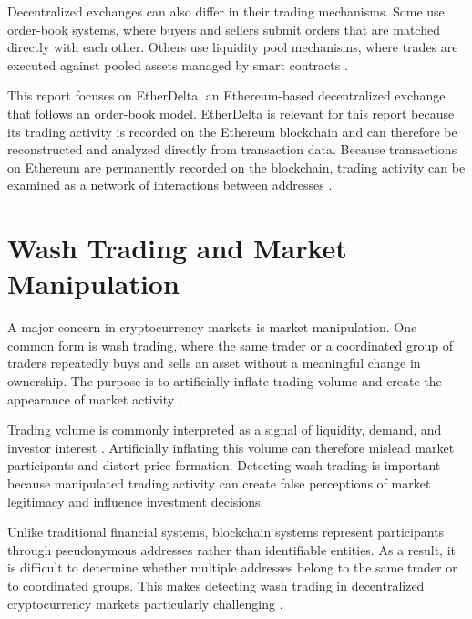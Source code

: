 \documentclass[language=english,thesis=bachelor,nosecondtitle,faculty=cb,onesided,13pt]{hsmw-thesis}
\begin{document}
Decentralized exchanges can also differ in their trading mechanisms. Some use order-book systems, where buyers and sellers submit orders that are matched directly with each other. Others use liquidity pool mechanisms, where trades are executed against pooled assets managed by smart contracts \cite{adams2020uniswap}.

This report focuses on EtherDelta, an Ethereum-based decentralized exchange that follows an order-book model. EtherDelta is relevant for this report because its trading activity is recorded on the Ethereum blockchain and can therefore be reconstructed and analyzed directly from transaction data. Because transactions on Ethereum are permanently recorded on the blockchain, trading activity can be examined as a network of interactions between addresses \cite{chen2020traveling, somin2018network}.

	\section{Wash Trading and Market Manipulation}
A major concern in cryptocurrency markets is market manipulation. One common form is wash trading, where the same trader or a coordinated group of traders repeatedly buys and sells an asset without a meaningful change in ownership. The purpose is to artificially inflate trading volume and create the appearance of market activity \cite{imisiker2018wash, cao2016detecting}.

Trading volume is commonly interpreted as a signal of liquidity, demand, and investor interest \cite{cong2023crypto, bianchi2019trading}. Artificially inflating this volume can therefore mislead market participants and distort price formation. Detecting wash trading is important because manipulated trading activity can create false perceptions of market legitimacy and influence investment decisions.

Unlike traditional financial systems, blockchain systems represent participants through pseudonymous addresses rather than identifiable entities. As a result, it is difficult to determine whether multiple addresses belong to the same trader or to coordinated groups. This makes detecting wash trading in decentralized cryptocurrency markets particularly challenging \cite{victor2021detecting, cui2023chain}.
\end{document}
